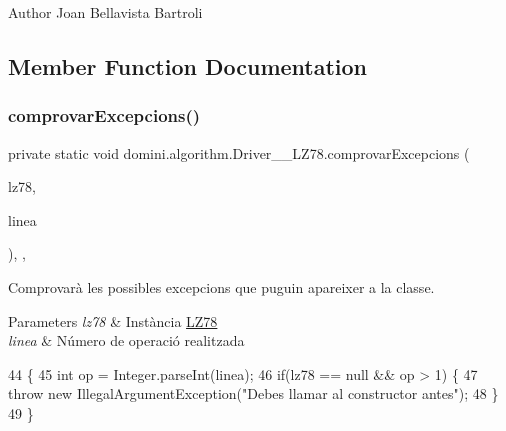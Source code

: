\begin{DoxyAuthor}{Author}
Joan Bellavista Bartroli 
\end{DoxyAuthor}


\subsection{Member Function Documentation}
\mbox{\label{classdomini_1_1algorithm_1_1Driver____LZ78_a21b185a3310ced322a1eb1b49f889f15}} 
\subsubsection{\texorpdfstring{comprovar\+Excepcions()}{comprovarExcepcions()}}
{\footnotesize\ttfamily private static void domini.\+algorithm.\+Driver\+\_\+\+\_\+\+L\+Z78.\+comprovar\+Excepcions (\begin{DoxyParamCaption}\item[{\hyperlink{classdomini_1_1algorithm_1_1LZ78}{L\+Z78}}]{lz78,  }\item[{String}]{linea }\end{DoxyParamCaption})\hspace{0.3cm}{\ttfamily [inline]}, {\ttfamily [static]}, {\ttfamily [private]}}



Comprovarà les possibles excepcions que puguin apareixer a la classe. 


\begin{DoxyParams}{Parameters}
{\em lz78} & Instància \hyperlink{classdomini_1_1algorithm_1_1LZ78}{L\+Z78} \\
\hline
{\em linea} & Número de operació realitzada \\
\hline
\end{DoxyParams}

\begin{DoxyCode}
44                                                                     \{
45         \textcolor{keywordtype}{int} op = Integer.parseInt(linea);
46         \textcolor{keywordflow}{if}(lz78 == null && op > 1) \{
47             \textcolor{keywordflow}{throw} \textcolor{keyword}{new} IllegalArgumentException(\textcolor{stringliteral}{"Debes llamar al constructor antes"});
48         \}
49     \}
\end{DoxyCode}
\mbox{\label{classdomini_1_1algorithm_1_1Driver____LZ78_a3f8db12503ffe92702d5b6670c56e792}} 
